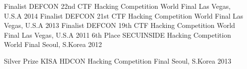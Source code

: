     \begin{cvhonors}
      \cvhonor
        {Finalist}
        {DEFCON 22nd CTF Hacking Competition World Final}
        {Las Vegas, U.S.A}
        {2014}
      \cvhonor
        {Finalist}
        {DEFCON 21st CTF Hacking Competition World Final}
        {Las Vegas, U.S.A}
        {2013}
      \cvhonor
        {Finalist}
        {DEFCON 19th CTF Hacking Competition World Final}
        {Las Vegas, U.S.A}
        {2011}
      \cvhonor
        {6th Place}
        {SECUINSIDE Hacking Competition World Final}
        {Seoul, S.Korea}
        {2012}
    \end{cvhonors}

    \begin{cvhonors}
      \cvhonor
        {Silver Prize}
        {KISA HDCON Hacking Competition Final}
        {Seoul, S.Korea}
        {2013}
    \end{cvhonors}

